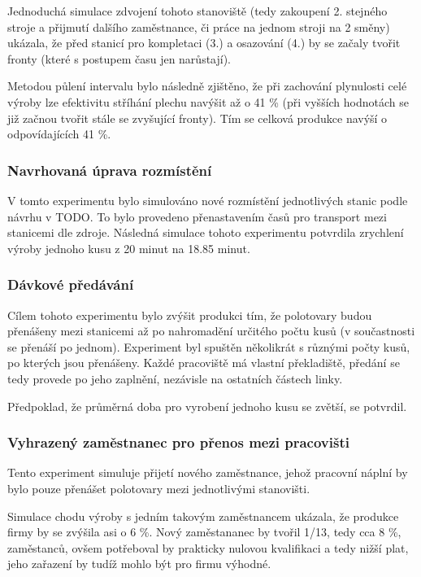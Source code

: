 \documentclass[11pt, a4paper]{article}
\begin{document}
Jednoduchá simulace zdvojení tohoto stanoviště (tedy zakoupení 2. stejného stroje a přijmutí dalšího zaměstnance, či práce na jednom stroji na 2 směny) ukázala, že před stanicí pro kompletaci (3.) a osazování (4.) by se začaly tvořit fronty (které s postupem času jen narůstají).

Metodou půlení intervalu bylo následně zjištěno, že při zachování plynulosti celé výroby lze efektivitu stříhání plechu navýšit až o 41 \% (při vyšších hodnotách se již začnou tvořit stále se zvyšující fronty). Tím se celková produkce navýší o odpovídajících 41 \%.


\subsubsection{Navrhovaná úprava rozmístění}
V tomto experimentu bylo simulováno nové rozmístění jednotlivých stanic podle návrhu v TODO. To bylo provedeno přenastavením časů pro transport mezi stanicemi dle zdroje. Následná simulace tohoto experimentu potvrdila zrychlení výroby jednoho kusu z 20 minut na 18.85 minut.


\subsubsection{Dávkové předávání}
Cílem tohoto experimentu bylo zvýšit produkci tím, že polotovary budou přenášeny mezi stanicemi až po nahromadění určitého počtu kusů (v součastnosti se přenáší po jednom). Experiment byl spuštěn několikrát s různými počty kusů, po kterých jsou přenášeny. Každé pracoviště má vlastní překladiště, předání se tedy provede po jeho zaplnění, nezávisle na ostatních částech linky.

Předpoklad, že průměrná doba pro vyrobení jednoho kusu se zvětší, se potvrdil.


\subsubsection{Vyhrazený zaměstnanec pro přenos mezi pracovišti}
Tento experiment simuluje přijetí nového zaměstnance, jehož pracovní náplní by bylo pouze přenášet polotovary mezi jednotlivými stanovišti.

Simulace chodu výroby s jedním takovým zaměstnancem ukázala, že produkce firmy by se zvýšila asi o 6 \%. Nový zaměstananec by tvořil 1/13, tedy cca 8 \%, zaměstanců, ovšem potřeboval by prakticky nulovou kvalifikaci a tedy nižší plat, jeho zařazení by tudíž mohlo být pro firmu výhodné.
\end{document}
